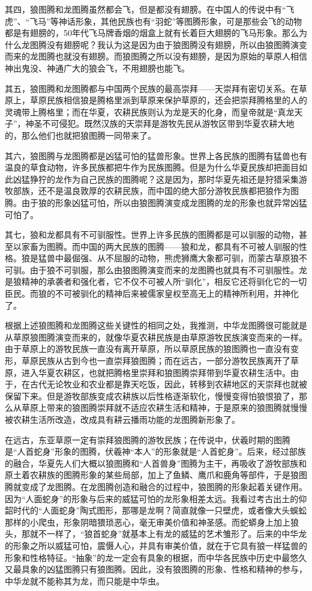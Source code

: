 \par 其四，狼图腾和龙图腾虽然都会飞，但是都没有翅膀。在中国人的传说中有“飞虎”、“飞马”等神话形象，其他民族也有“羽蛇”等图腾形象，可是那些会飞的动物都是有翅膀的，50年代飞马牌香烟的烟盒上就有长着巨大翅膀的飞马形象。那么为什么龙图腾没有翅膀呢？我认为这是因为由于狼图腾没有翅膀，所以由狼图腾演变而来的龙图腾也就没有翅膀。而狼图腾之所以没有翅膀，是因为原始的草原人相信神出鬼没、神通广大的狼会飞，不用翅膀也能飞。
\par 其五，狼图腾和龙图腾都与中国两个民族的最高崇拜——天崇拜有密切关系。在草原上，草原民族相信狼是腾格里派到草原来保护草原的，还会把崇拜腾格里的人的灵魂带上腾格里；而在华夏，农耕民族则认为龙是天的化身，而皇帝就是“真龙天子”，神圣不可侵犯。既然汉族的天崇拜是游牧先民从游牧区带到华夏农耕大地的，那么他们也就把狼图腾一同带来了。
\par 其六，狼图腾与龙图腾都是凶猛可怕的猛兽形象。世界上各民族的图腾有猛兽也有温良的草食动物，许多民族都把牛作为民族图腾。但是为什么华夏民族却把面目如此凶猛狰狞的龙作为自己民族的图腾呢？这是因为，那时华夏先祖还是狩猎采集游牧部族，还不是温良敦厚的农耕民族，而中国的绝大部分游牧民族都把狼作为图腾。由于狼的形象凶猛可怕，所以由狼图腾演变成龙图腾的龙的形象也就异常凶猛可怕了。
\par 其七，狼和龙都具有不可驯服性。世界上许多民族的图腾都是可以驯服的动物，甚至以家畜为图腾。而中国的两大民族的图腾——狼和龙，都具有不可被人驯服的性格。狼是猛兽中最倔强、从不屈服的动物，熊虎狮鹰大象都可驯，而蒙古草原狼不可驯。由于狼不可驯服，那么由狼图腾演变而来的龙图腾也就具有不可驯服性。龙是狼精神的承袭者和强化者，它不仅不可被人所“驯化”，相反它还将驯化它的一切臣民。而狼的不可被驯化的精神后来被儒家皇权至高无上的精神所利用，并神化了。
\par 根据上述狼图腾和龙图腾这些关键性的相同之处，我推测，中华龙图腾很可能就是从草原狼图腾演变而来的，就像华夏农耕民族是由草原游牧民族演变而来的一样。由于草原上的游牧民族一直没有离开草原，所以草原民族的狼图腾也一直没有变形，草原民族从古到今也一直崇拜狼图腾；而在远古，一部分游牧民族离开了草原，进入华夏农耕区，也就把腾格里崇拜和狼图腾崇拜带到华夏农耕生活中。由于，在古代无论牧业和农业都是靠天吃饭，因此，转移到农耕地区的天崇拜也就被保留下来。但是游牧部族变成农耕族以后性格逐渐软化，慢慢变得怕狼恨狼了，那么从草原上带来的狼图腾崇拜就不适应农耕生活和精神，于是原来的狼图腾就慢慢被农耕生活所改造，改成具有耕云播雨功能的龙图腾新形象了。
\par 在远古，东亚草原一定有崇拜狼图腾的游牧民族；在传说中，伏羲时期的图腾是“人首蛇身”形象的图腾，伏羲神“本人”的形象就是“人首蛇身”。后来，经过部族的融合，华夏先人们大概以狼图腾和“人首兽身”图腾为主干，再吸收了游牧部族和原土着农耕族的图腾形象的某些局部，加上了鱼鳞、鹰爪和鹿角等部件，于是狼图腾就变成了龙图腾。在龙图腾创造和融合的过程中，狼图腾的形象起着关键作用。因为“人面蛇身”的形象与后来的威猛可怕的龙形象相差太远。我看过考古出土的仰韶时代的“人面蛇身”陶式图形，那哪是龙啊？简直就像一只壁虎，或者像大头蜈蚣那样的小爬虫，形象阴暗猥琐恶心，毫无审美价值和神圣感。而蛇蟒身上加上狼头，那就不一样了，“狼首蛇身”就基本上有龙的威猛的艺术雏形了。后来的中华龙的形象之所以威猛可怕，震慑人心，并具有审美价值，就在于它具有狼一样猛兽的形象和性格特征。“抽象”的龙一定会有具象的根据，而中华各民族中历史中最悠久又最具象的凶猛图腾只有狼图腾。因此，没有狼图腾的形象、性格和精神的参与，中华龙就不能称其为龙，而只能是中华虫。
